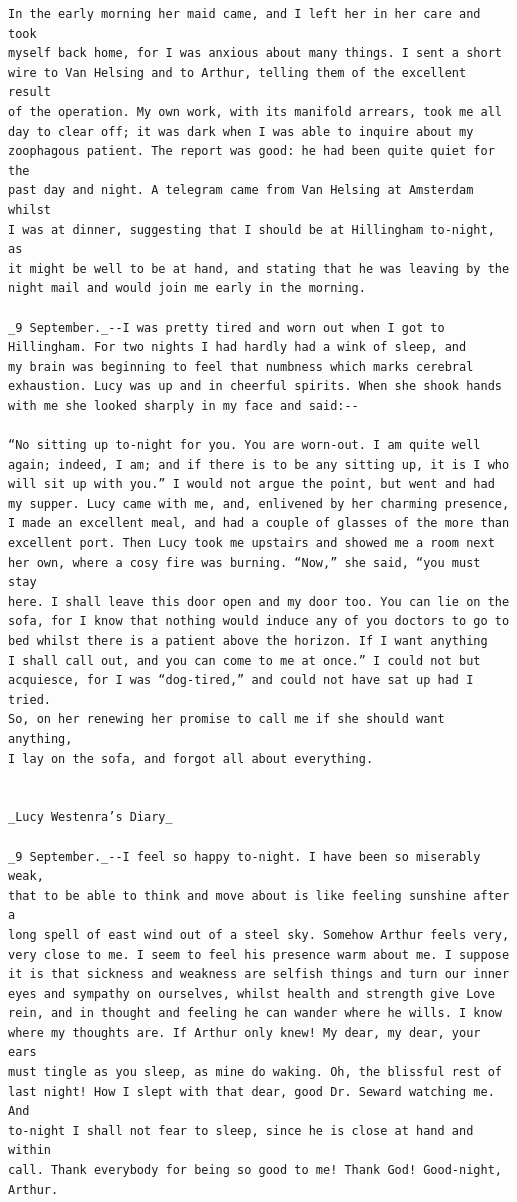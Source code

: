 \documentclass{article}
\begin{document}
\begin{verbatim}
In the early morning her maid came, and I left her in her care and took
myself back home, for I was anxious about many things. I sent a short
wire to Van Helsing and to Arthur, telling them of the excellent result
of the operation. My own work, with its manifold arrears, took me all
day to clear off; it was dark when I was able to inquire about my
zoophagous patient. The report was good: he had been quite quiet for the
past day and night. A telegram came from Van Helsing at Amsterdam whilst
I was at dinner, suggesting that I should be at Hillingham to-night, as
it might be well to be at hand, and stating that he was leaving by the
night mail and would join me early in the morning.

_9 September._--I was pretty tired and worn out when I got to
Hillingham. For two nights I had hardly had a wink of sleep, and
my brain was beginning to feel that numbness which marks cerebral
exhaustion. Lucy was up and in cheerful spirits. When she shook hands
with me she looked sharply in my face and said:--

“No sitting up to-night for you. You are worn-out. I am quite well
again; indeed, I am; and if there is to be any sitting up, it is I who
will sit up with you.” I would not argue the point, but went and had
my supper. Lucy came with me, and, enlivened by her charming presence,
I made an excellent meal, and had a couple of glasses of the more than
excellent port. Then Lucy took me upstairs and showed me a room next
her own, where a cosy fire was burning. “Now,” she said, “you must stay
here. I shall leave this door open and my door too. You can lie on the
sofa, for I know that nothing would induce any of you doctors to go to
bed whilst there is a patient above the horizon. If I want anything
I shall call out, and you can come to me at once.” I could not but
acquiesce, for I was “dog-tired,” and could not have sat up had I tried.
So, on her renewing her promise to call me if she should want anything,
I lay on the sofa, and forgot all about everything.


_Lucy Westenra’s Diary_

_9 September._--I feel so happy to-night. I have been so miserably weak,
that to be able to think and move about is like feeling sunshine after a
long spell of east wind out of a steel sky. Somehow Arthur feels very,
very close to me. I seem to feel his presence warm about me. I suppose
it is that sickness and weakness are selfish things and turn our inner
eyes and sympathy on ourselves, whilst health and strength give Love
rein, and in thought and feeling he can wander where he wills. I know
where my thoughts are. If Arthur only knew! My dear, my dear, your ears
must tingle as you sleep, as mine do waking. Oh, the blissful rest of
last night! How I slept with that dear, good Dr. Seward watching me. And
to-night I shall not fear to sleep, since he is close at hand and within
call. Thank everybody for being so good to me! Thank God! Good-night,
Arthur.



\end{verbatim}
\end{document}
